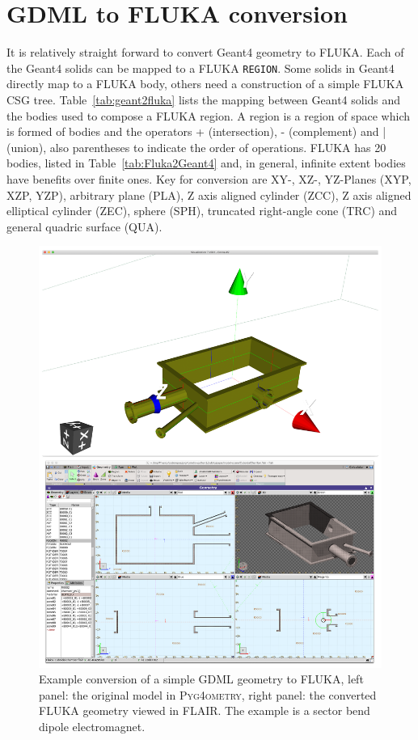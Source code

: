 \documentclass[final,5p,times,twocolumn]{elsarticle}
\newcommand{\PYGEOMETRY}{\textsc{Pyg4ometry}}
\begin{document}
\section{GDML to FLUKA conversion}
It is relatively straight forward to convert Geant4 geometry to FLUKA. Each of the Geant4 
solids can be mapped to a FLUKA \verb|REGION|. Some solids in Geant4 directly map to 
a FLUKA body, others need a construction of a simple FLUKA CSG tree. Table~\ref{tab:geant2fluka}
lists the mapping between Geant4 solids and the bodies used to compose a FLUKA region.
A region is a region of space which is formed of bodies and the operators + (intersection), - 
(complement) and | (union), also parentheses to indicate the order of operations. FLUKA 
has 20 bodies, listed in Table~\ref{tab:Fluka2Geant4}  and, in general, infinite extent bodies have 
benefits over finite ones. Key for conversion are XY-, XZ-, YZ-Planes (XYP, XZP, YZP), arbitrary 
plane (PLA), Z axis aligned cylinder (ZCC), Z axis aligned elliptical cylinder (ZEC), 
sphere (SPH), truncated right-angle cone (TRC) and general quadric surface (QUA). 
\begin{figure}
\begin{center}
\includegraphics[width=0.9\columnwidth]{./model-scene/CuboidalChamber.pdf}
\caption{Example conversion of a simple GDML geometry to FLUKA, left panel:  
the original model in \PYGEOMETRY{}, right panel: the converted FLUKA geometry 
viewed in FLAIR. The example is a sector bend dipole electromagnet.}
\label{fig:gdml-flair}
\end{center}
\end{figure}
\end{document}
